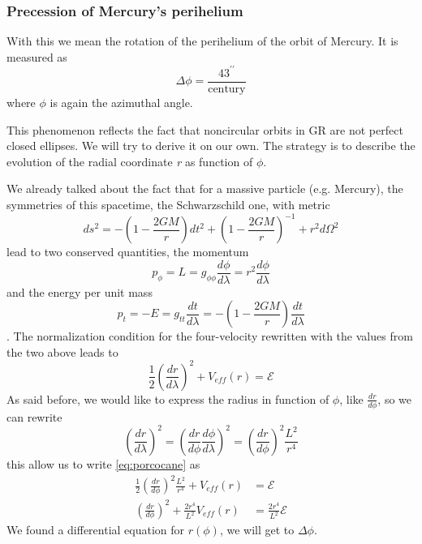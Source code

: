 \subsubsection{Precession of Mercury's perihelium}
With this we mean the rotation of the perihelium of the orbit of Mercury. It is measured as 
\[
\Delta \phi = \frac{43^{\prime \prime }}{\text{century}}
\]
where $\phi $ is again the azimuthal angle. \par
This phenomenon reflects the fact that noncircular orbits in GR are not perfect closed ellipses. We will try to derive it on our own. The strategy is to describe the evolution of the radial coordinate \emph{r} as function of $\phi $.\par
We already talked about the fact that for a massive particle (e.g. Mercury), the symmetries of this spacetime, the Schwarzschild one, with metric
\[
ds^{2} = -\left( 1- \frac{2GM}{r} \right)dt^{2} + \left( 1- \frac{2GM}{r} \right)^{-1} + r^{2}d\Omega ^{2}
\]
lead to two conserved quantities, the momentum
\begin{equation}
	p_{\phi } = L = g_{\phi \phi } \frac{d \phi }{d \lambda } = r^{2} \frac{d \phi }{d \lambda }
\end{equation}
and the energy per unit mass
\begin{equation}
p_{t} = - E = g_{tt}\frac{d t}{d \lambda } = - \left( 1- \frac{2GM}{r} \right) \frac{d t }{d \lambda }
\end{equation}.
The normalization condition for the four-velocity rewritten with the values from the two above leads to
\begin{equation}\label{eq:porcocane}
\frac{1}{2}\left( \frac{d r}{d \lambda } \right)^{2} + V_{eff}\left( r \right) = \mathcal{E}
\end{equation}
As said before, we would like to express the radius in function of $\phi $, like $\frac{d r}{d \phi }$, so we can rewrite
\begin{equation}
	\left( \frac{d r}{d \lambda } \right) ^{2} = \left( \frac{d r}{d \phi } \frac{d \phi }{d \lambda } \right)^{2} = \left( \frac{d r}{d \phi } \right)^{2} \frac{L^{2}}{r^{4}}
\end{equation}
this allow us to write \ref{eq:porcocane} as 
\begin{align}
	\frac{1}{2} \left( \frac{d r}{d \phi } \right)^{2} \frac{L^{2}}{r^{4}} + V_{eff}\left( r \right) &= \mathcal{E} \\
	\left( \frac{d r}{d \phi } \right)^{2} + \frac{2r^{4}}{L^{2}}V_{eff}\left( r \right) &= \frac{2r^{4}}{L^{2}}\mathcal{E}	
\end{align}
We found a differential equation for $r\left( \phi  \right)$, we will get to $\Delta \phi $.















